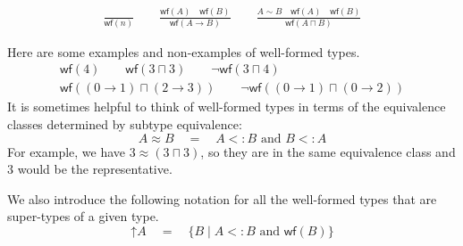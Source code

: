 \documentclass{article}
\newcommand{\WF}[1]{\mathsf{wf}(#1)}
\newcommand{\UP}[1]{\mathord{\uparrow} #1}
\begin{document}
\begin{gather*}
  \frac{}{\WF{n}}
  \qquad
  \frac{\WF{A} \quad \WF{B}}{\WF{A \to B}}
  \qquad
  \frac{A \sim B \quad \WF{A} \quad \WF{B}}{\WF{A \sqcap B}}
\end{gather*}

Here are some examples and non-examples of well-formed types.
\begin{gather*}
  \WF{4} \qquad \WF{3 \sqcap 3} \qquad \neg \WF{3 \sqcap 4} \\
  \WF{(0\to 1) \sqcap (2 \to 3)} \qquad \neg \WF{(0 \to 1) \sqcap (0 \to 2)}
\end{gather*}
It is sometimes helpful to think of well-formed types in terms of the
equivalence classes determined by subtype equivalence:
\[
A \approx B \quad = \quad
  A <: B \text{ and } B <: A
\]
For example, we have $3 \approx (3 \sqcap 3)$, so they are
in the same equivalence class and $3$ would be the representative.


We also introduce the following notation for all the well-formed types
that are super-types of a given type.
\[
   \UP{A} \quad = \quad \{ B\mid A <: B \text{ and } \WF{B} \}
\]
\end{document}
